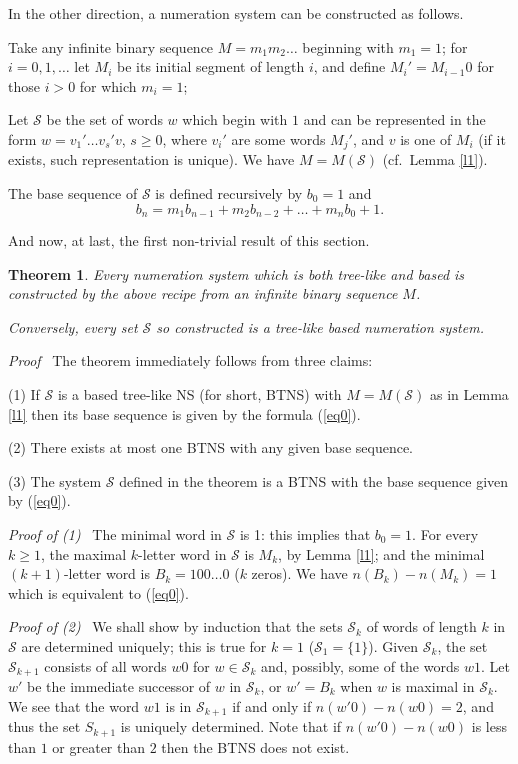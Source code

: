 \documentclass[12pt]{article}
\newtheorem{theorem}{Theorem}[section]
\newcommand{\head}[1]{\medbreak\noindent\textit{#1}\ }
\begin{document}
\medbreak

In the other direction, a numeration system can be constructed as follows.

Take any infinite binary sequence $M=m_1m_2\ldots$ beginning with $m_1=1$;
for $i=0,1,\ldots$ let $M_i$ be its initial segment of length $i$, and
define $M_i'=M_{i-1}0$ for those $i>0$ for which $m_i=1$;

Let $\mathcal{S}$ be the set of words $w$ which begin with $1$ and can be
represented in the form $w=v_1'\ldots v_s'v$, $s\geq 0$, where $v_i'$ are
some words $M_j'$, and $v$ is one of $M_i$ (if it exists, such representation
is unique). We have $M=M(\mathcal{S})$ (cf.\ Lemma \ref{l1}).

The base sequence of $\mathcal{S}$ is defined recursively by $b_0=1$ and
\begin{equation}
b_{n}=m_1b_{n-1}+m_2b_{n-2}+\ldots+m_nb_0+1.\label{eq0}
\end{equation}

And now, at last, the first non-trivial result of this section.

\begin{theorem}\label{t1}
Every numeration system which is both tree-like and based is
constructed by the above recipe from an infinite binary sequence $M$.

Conversely, every set $\mathcal{S}$ so constructed is a tree-like based
numeration system.
\end{theorem}

\head{Proof} The theorem immediately follows from three claims:

(1) If $\mathcal{S}$ is a based tree-like NS (for short, BTNS) with
$M=M(\mathcal{S})$ as in Lemma \ref{l1} then its base sequence is given
by the formula (\ref{eq0}).

(2) There exists at most one BTNS with any given base sequence.

(3) The system $\mathcal{S}$ defined in the theorem is a BTNS with the base
sequence given by (\ref{eq0}).

\head{Proof of (1)} The minimal word in $\mathcal{S}$ is 1: this implies that
$b_0=1$. For every $k\geq 1$, the maximal $k$-letter word in $\mathcal{S}$ is
$M_k$, by Lemma \ref{l1}; and the minimal $(k+1)$-letter word is
$B_k=100\ldots 0$ ($k$ zeros). We have $n(B_k)-n(M_k)=1$ which is equivalent
to (\ref{eq0}).

\head{Proof of (2)} We shall show by induction that the sets $\mathcal{S}_k$
of words of length $k$ in $\mathcal{S}$ are determined uniquely; this is true
for $k=1$ ($\mathcal{S}_1=\{1\}$). Given $\mathcal{S}_k$, the set
$\mathcal{S}_{k+1}$ consists of all words $w0$ for $w\in\mathcal{S}_k$ and,
possibly, some of the words $w1$. Let $w'$ be the immediate successor of $w$
in $\mathcal{S}_k$, or $w'=B_k$ when $w$ is maximal in $\mathcal{S}_k$. We
see that the word $w1$ is in $\mathcal{S}_{k+1}$ if and only if
$n(w'0)-n(w0)=2$, and thus the set $S_{k+1}$ is uniquely determined. Note
that if $n(w'0)-n(w0)$ is less than $1$ or greater than $2$ then the
BTNS does not exist.
\end{document}
